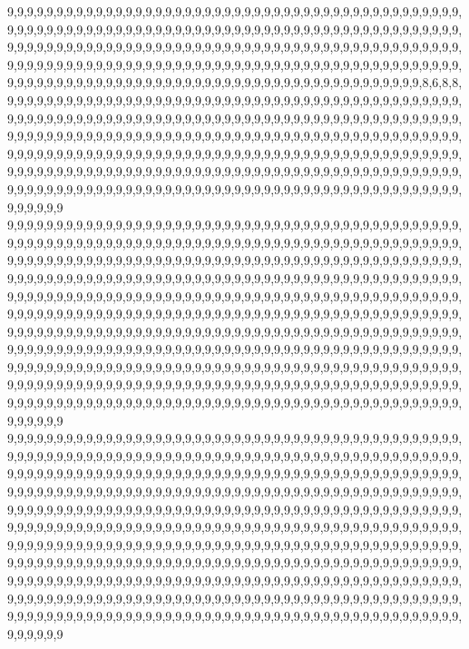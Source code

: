 9,9,9,9,9,9,9,9,9,9,9,9,9,9,9,9,9,9,9,9,9,9,9,9,9,9,9,9,9,9,9,9,9,9,9,9,9,9,9,9,9,9,9,9,9,9,9,9,9,9,9,9,9,9,9,9,9,9,9,9,9,9,9,9,9,9,9,9,9,9,9,9,9,9,9,9,9,9,9,9,9,9,9,9,9,9,9,9,9,9,9,9,9,9,9,9,9,9,9,9,9,9,9,9,9,9,9,9,9,9,9,9,9,9,9,9,9,9,9,9,9,9,9,9,9,9,9,9,9,9,9,9,9,9,9,9,9,9,9,9,9,9,9,9,9,9,9,9,9,9,9,9,9,9,9,9,9,9,9,9,9,9,9,9,9,9,9,9,9,9,9,9,9,9,9,9,9,9,9,9,9,9,9,9,9,9,9,9,9,9,9,9,9,9,9,9,9,9,9,9,9,9,9,9,9,9,9,9,9,9,9,9,9,9,9,9,9,9,9,9,9,9,9,9,9,9,8,6,8,8,9,9,9,9,9,9,9,9,9,9,9,9,9,9,9,9,9,9,9,9,9,9,9,9,9,9,9,9,9,9,9,9,9,9,9,9,9,9,9,9,9,9,9,9,9,9,9,9,9,9,9,9,9,9,9,9,9,9,9,9,9,9,9,9,9,9,9,9,9,9,9,9,9,9,9,9,9,9,9,9,9,9,9,9,9,9,9,9,9,9,9,9,9,9,9,9,9,9,9,9,9,9,9,9,9,9,9,9,9,9,9,9,9,9,9,9,9,9,9,9,9,9,9,9,9,9,9,9,9,9,9,9,9,9,9,9,9,9,9,9,9,9,9,9,9,9,9,9,9,9,9,9,9,9,9,9,9,9,9,9,9,9,9,9,9,9,9,9,9,9,9,9,9,9,9,9,9,9,9,9,9,9,9,9,9,9,9,9,9,9,9,9,9,9,9,9,9,9,9,9,9,9,9,9,9,9,9,9,9,9,9,9,9,9,9,9,9,9,9,9,9,9,9,9,9,9,9,9,9,9,9,9,9,9,9,9,9,9,9,9,9,9,9,9,9,9,9,9,9,9,9,9,9,9,9,9,9,9,9,9,9,9,9,9,9,9,9,9,9,9,9,9,9,9,9,9,9,9,9,9,9,9
9,9,9,9,9,9,9,9,9,9,9,9,9,9,9,9,9,9,9,9,9,9,9,9,9,9,9,9,9,9,9,9,9,9,9,9,9,9,9,9,9,9,9,9,9,9,9,9,9,9,9,9,9,9,9,9,9,9,9,9,9,9,9,9,9,9,9,9,9,9,9,9,9,9,9,9,9,9,9,9,9,9,9,9,9,9,9,9,9,9,9,9,9,9,9,9,9,9,9,9,9,9,9,9,9,9,9,9,9,9,9,9,9,9,9,9,9,9,9,9,9,9,9,9,9,9,9,9,9,9,9,9,9,9,9,9,9,9,9,9,9,9,9,9,9,9,9,9,9,9,9,9,9,9,9,9,9,9,9,9,9,9,9,9,9,9,9,9,9,9,9,9,9,9,9,9,9,9,9,9,9,9,9,9,9,9,9,9,9,9,9,9,9,9,9,9,9,9,9,9,9,9,9,9,9,9,9,9,9,9,9,9,9,9,9,9,9,9,9,9,9,9,9,9,9,9,9,9,9,9,9,9,9,9,9,9,9,9,9,9,9,9,9,9,9,9,9,9,9,9,9,9,9,9,9,9,9,9,9,9,9,9,9,9,9,9,9,9,9,9,9,9,9,9,9,9,9,9,9,9,9,9,9,9,9,9,9,9,9,9,9,9,9,9,9,9,9,9,9,9,9,9,9,9,9,9,9,9,9,9,9,9,9,9,9,9,9,9,9,9,9,9,9,9,9,9,9,9,9,9,9,9,9,9,9,9,9,9,9,9,9,9,9,9,9,9,9,9,9,9,9,9,9,9,9,9,9,9,9,9,9,9,9,9,9,9,9,9,9,9,9,9,9,9,9,9,9,9,9,9,9,9,9,9,9,9,9,9,9,9,9,9,9,9,9,9,9,9,9,9,9,9,9,9,9,9,9,9,9,9,9,9,9,9,9,9,9,9,9,9,9,9,9,9,9,9,9,9,9,9,9,9,9,9,9,9,9,9,9,9,9,9,9,9,9,9,9,9,9,9,9,9,9,9,9,9,9,9,9,9,9,9,9,9,9,9,9,9,9,9,9,9,9,9,9,9,9,9,9,9,9,9,9,9,9,9,9,9,9,9,9,9,9,9,9,9,9,9,9,9,9,9,9,9,9,9,9,9,9,9,9,9
9,9,9,9,9,9,9,9,9,9,9,9,9,9,9,9,9,9,9,9,9,9,9,9,9,9,9,9,9,9,9,9,9,9,9,9,9,9,9,9,9,9,9,9,9,9,9,9,9,9,9,9,9,9,9,9,9,9,9,9,9,9,9,9,9,9,9,9,9,9,9,9,9,9,9,9,9,9,9,9,9,9,9,9,9,9,9,9,9,9,9,9,9,9,9,9,9,9,9,9,9,9,9,9,9,9,9,9,9,9,9,9,9,9,9,9,9,9,9,9,9,9,9,9,9,9,9,9,9,9,9,9,9,9,9,9,9,9,9,9,9,9,9,9,9,9,9,9,9,9,9,9,9,9,9,9,9,9,9,9,9,9,9,9,9,9,9,9,9,9,9,9,9,9,9,9,9,9,9,9,9,9,9,9,9,9,9,9,9,9,9,9,9,9,9,9,9,9,9,9,9,9,9,9,9,9,9,9,9,9,9,9,9,9,9,9,9,9,9,9,9,9,9,9,9,9,9,9,9,9,9,9,9,9,9,9,9,9,9,9,9,9,9,9,9,9,9,9,9,9,9,9,9,9,9,9,9,9,9,9,9,9,9,9,9,9,9,9,9,9,9,9,9,9,9,9,9,9,9,9,9,9,9,9,9,9,9,9,9,9,9,9,9,9,9,9,9,9,9,9,9,9,9,9,9,9,9,9,9,9,9,9,9,9,9,9,9,9,9,9,9,9,9,9,9,9,9,9,9,9,9,9,9,9,9,9,9,9,9,9,9,9,9,9,9,9,9,9,9,9,9,9,9,9,9,9,9,9,9,9,9,9,9,9,9,9,9,9,9,9,9,9,9,9,9,9,9,9,9,9,9,9,9,9,9,9,9,9,9,9,9,9,9,9,9,9,9,9,9,9,9,9,9,9,9,9,9,9,9,9,9,9,9,9,9,9,9,9,9,9,9,9,9,9,9,9,9,9,9,9,9,9,9,9,9,9,9,9,9,9,9,9,9,9,9,9,9,9,9,9,9,9,9,9,9,9,9,9,9,9,9,9,9,9,9,9,9,9,9,9,9,9,9,9,9,9,9,9,9,9,9,9,9,9,9,9,9,9,9,9,9,9,9,9,9,9,9,9,9,9,9,9,9,9,9,9,9,9,9,9,9,9
